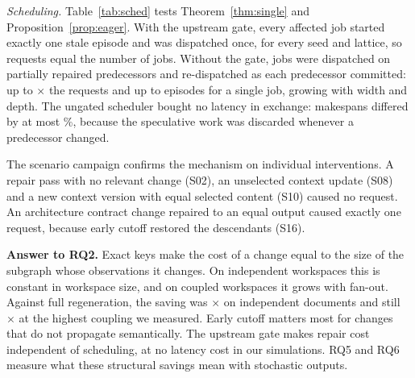 

\emph{Scheduling.} Table~\ref{tab:sched} tests Theorem~\ref{thm:single} and Proposition~\ref{prop:eager}. With the upstream gate, every affected job started exactly one stale episode and was dispatched once, for every seed and lattice, so requests equal the number of jobs. Without the gate, jobs were dispatched on partially repaired predecessors and re-dispatched as each predecessor committed: up to \SchedEagerReqRatioMax$\times$ the requests and up to \SchedEagerMaxEpisodes{} episodes for a single job, growing with width and depth. The ungated scheduler bought no latency in exchange: makespans differed by at most \SchedMakespanDiffPct\%, because the speculative work was discarded whenever a predecessor changed.



The scenario campaign confirms the mechanism on individual interventions. A repair pass with no relevant change (S02), an unselected context update (S08) and a new context version with equal selected content (S10) caused no request. An architecture contract change repaired to an equal output caused exactly one request, because early cutoff restored the descendants (S16).

\textbf{Answer to RQ2.} Exact keys make the cost of a change equal to the size of the subgraph whose observations it changes. On independent workspaces this is constant in workspace size, and on coupled workspaces it grows with fan-out. Against full regeneration, the saving was \RatioFull$\times$ on \CostMaxN{} independent documents and still \CoupledRatioFullFmax$\times$ at the highest coupling we measured. Early cutoff matters most for changes that do not propagate semantically. The upstream gate makes repair cost independent of scheduling, at no latency cost in our simulations. RQ5 and RQ6 measure what these structural savings mean with stochastic outputs.

